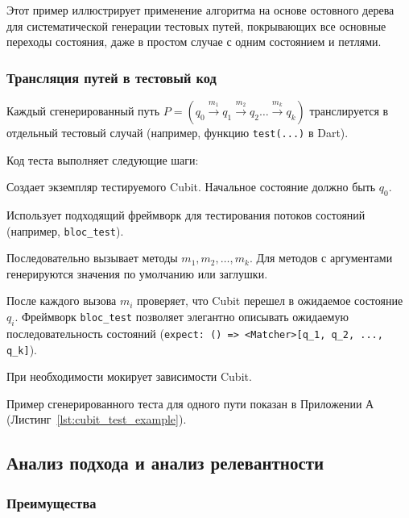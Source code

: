 \documentclass[14pt, russian]{scrartcl}
\begin{document}
Этот пример иллюстрирует применение алгоритма на основе остовного дерева для систематической генерации тестовых путей, покрывающих все основные переходы состояния, даже в простом случае с одним состоянием и петлями.



\subsubsection{Трансляция путей в тестовый код}

Каждый сгенерированный путь $P = (q_0 \xrightarrow{m_1} q_1 \xrightarrow{m_2} q_2 \dots \xrightarrow{m_k} q_k)$ транслируется в отдельный тестовый случай (например, функцию \texttt{test(...)} в Dart).

Код теста выполняет следующие шаги:
\begin{enumerate*}
    \item Создает экземпляр тестируемого Cubit. Начальное состояние должно быть $q_0$.
    \item Использует подходящий фреймворк для тестирования потоков состояний (например, \texttt{bloc\_test}).
    \item Последовательно вызывает методы $m_1, m_2, \dots, m_k$. Для методов с аргументами генерируются значения по умолчанию или заглушки.
    \item После каждого вызова $m_i$ проверяет, что Cubit перешел в ожидаемое состояние $q_i$. Фреймворк \texttt{bloc\_test} позволяет элегантно описывать ожидаемую последовательность состояний (\texttt{expect: () => <Matcher>[q\_1, q\_2, ..., q\_k]}).
    \item При необходимости мокирует зависимости Cubit.
\end{enumerate*}

Пример сгенерированного теста для одного пути показан в Приложении А (Листинг~\ref{lst:cubit_test_example}).

\subsection{Анализ подхода и анализ релевантности}


\subsubsection{Преимущества}
\end{document}
